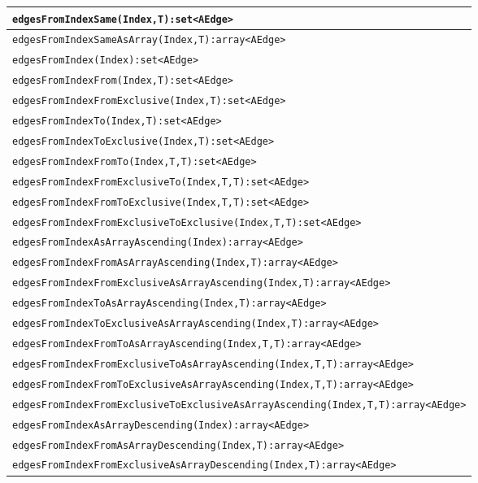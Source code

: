 \pagebreak

\begin{table}[htbp]
\centering
\begin{tabular}{|l|}
\hline
\texttt{edgesFromIndexSame(Index,T):set<AEdge>}\\
\hline
\texttt{edgesFromIndexSameAsArray(Index,T):array<AEdge>}\\
\hline
\texttt{edgesFromIndex(Index):set<AEdge>}\\
\texttt{edgesFromIndexFrom(Index,T):set<AEdge>}\\
\texttt{edgesFromIndexFromExclusive(Index,T):set<AEdge>}\\
\texttt{edgesFromIndexTo(Index,T):set<AEdge>}\\
\texttt{edgesFromIndexToExclusive(Index,T):set<AEdge>}\\
\texttt{edgesFromIndexFromTo(Index,T,T):set<AEdge>}\\
\texttt{edgesFromIndexFromExclusiveTo(Index,T,T):set<AEdge>}\\
\texttt{edgesFromIndexFromToExclusive(Index,T,T):set<AEdge>}\\
\texttt{edgesFromIndexFromExclusiveToExclusive(Index,T,T):set<AEdge>}\\
\hline
\texttt{edgesFromIndexAsArrayAscending(Index):array<AEdge>}\\
\texttt{edgesFromIndexFromAsArrayAscending(Index,T):array<AEdge>}\\
\texttt{edgesFromIndexFromExclusiveAsArrayAscending(Index,T):array<AEdge>}\\
\texttt{edgesFromIndexToAsArrayAscending(Index,T):array<AEdge>}\\
\texttt{edgesFromIndexToExclusiveAsArrayAscending(Index,T):array<AEdge>}\\
\texttt{edgesFromIndexFromToAsArrayAscending(Index,T,T):array<AEdge>}\\
\texttt{edgesFromIndexFromExclusiveToAsArrayAscending(Index,T,T):array<AEdge>}\\
\texttt{edgesFromIndexFromToExclusiveAsArrayAscending(Index,T,T):array<AEdge>}\\
\texttt{edgesFromIndexFromExclusiveToExclusiveAsArrayAscending(Index,T,T):array<AEdge>}\\
\hline
\texttt{edgesFromIndexAsArrayDescending(Index):array<AEdge>}\\
\texttt{edgesFromIndexFromAsArrayDescending(Index,T):array<AEdge>}\\
\texttt{edgesFromIndexFromExclusiveAsArrayDescending(Index,T):array<AEdge>}\\

\end{tabular}
\end{table}
